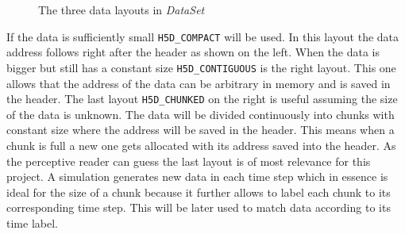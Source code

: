 \begin{figure}[ht!]
\caption{The three data layouts in \textit{DataSet}}
\label{fig:datalayout}
\end{figure}

If the data is sufficiently small \texttt{H5D\_COMPACT} will be used. In this layout the data address follows right after the header as shown on the left. When the data is bigger but still has a constant size \texttt{H5D\_CONTIGUOUS} is the right layout. This one allows that the address of the data can be arbitrary in memory and is saved in the header. The last layout \texttt{H5D\_CHUNKED} on the right is useful assuming the size of the data is unknown. The data will be divided continuously into chunks with constant size where the address will be saved in the header. This means when a chunk is full a new one gets allocated with its address saved into the header. As the perceptive reader can guess the last layout is of most relevance for this project. A simulation generates new data in each time step which in essence is ideal for the size of a chunk because it further allows to label each chunk to its corresponding time step. This will be later used to match data according to its time label.

